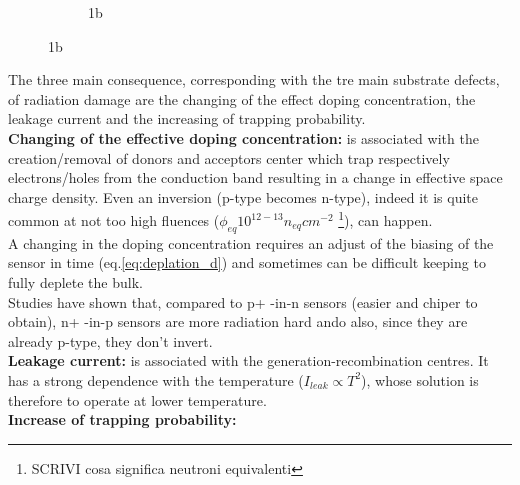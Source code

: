\begin{titlepage}
\begin{figure}
\begin{subfigure}{.5\textwidth}
     \caption{1b}
     \label{fig:type_inversion}
   \end{subfigure}
\end{figure}
The three main consequence, corresponding with the tre main substrate defects, of radiation damage are
the changing of the effect doping concentration, the leakage current and the increasing of
trapping probability.\\
\textbf{Changing of the effective doping concentration:} is associated with the creation/removal 
of donors and acceptors center which trap respectively electrons/holes from the 
conduction band resulting in a change in effective space charge 
density. Even an inversion (p-type becomes n-type), indeed it is quite common at 
not too high fluences ($\phi_{eq} 10^{12-13}n_{eq}cm^{-2}$ \footnote{SCRIVI cosa significa neutroni equivalenti}), 
can happen. \\
A changing in the doping concentration requires an adjust of the biasing of the sensor in time  
(eq.\ref{eq:deplation_d}) and sometimes can be difficult keeping to fully deplete the bulk.\\
Studies have shown that, compared to p+ -in-n sensors (easier and chiper to obtain), n+ -in-p sensors are more radiation hard  
ando also, since they are already p-type, they don't invert.\\
\textbf{Leakage current:} is associated with the generation-recombination centres. It has a 
strong dependence with the temperature ($I_{leak}\propto T^2$), whose solution is therefore 
to operate at lower temperature.\\
\textbf{Increase of trapping probability:}




\end{titlepage}
